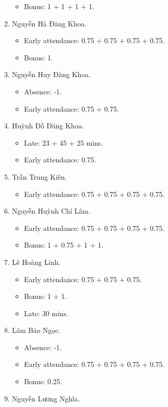 \documentclass{article}
\begin{document}
\begin{enumerate}
\begin{itemize}
		\item Bonus: 1 + 1 + 1 + 1.
	\end{itemize}
	\item {\sc Nguyễn Hà Đăng Khoa}.
	\begin{itemize}
		\item Early attendance: 0.75 + 0.75 + 0.75 + 0.75.
		\item Bonus: 1.
	\end{itemize}
	\item {\sc Nguyễn Huy Đăng Khoa.}
	\begin{itemize}
		\item Absence: -1.
		\item Early attendance: 0.75 + 0.75.
	\end{itemize}
	\item {\sc Huỳnh Đỗ Đăng Khoa.}
	\begin{itemize}
		\item Late: 23 + 45 + 25 mins.
		\item Early attendance: 0.75.
	\end{itemize}
	\item {\sc Trần Trung Kiên.}
	\begin{itemize}
		\item Early attendance: 0.75 + 0.75 + 0.75 + 0.75.
	\end{itemize}
	\item {\sc Nguyễn Huỳnh Chí Lâm.}
	\begin{itemize}
		\item Early attendance: 0.75 + 0.75 + 0.75 + 0.75.
		\item Bonus: 1 + 0.75 + 1 + 1.
	\end{itemize}
	\item {\sc Lê Hoàng Linh.}
	\begin{itemize}
		\item Early attendance: 0.75 + 0.75 + 0.75.
		\item Bonus: 1 + 1.
		\item Late: 30 mins.
	\end{itemize}
	\item {\sc Lâm Bảo Ngọc.}
	\begin{itemize}
		\item Absence: -1.
		\item Early attendance: 0.75 + 0.75 + 0.75 + 0.75.
		\item Bonus: 0.25.
	\end{itemize}
	\item {\sc Nguyễn Lương Nghĩa.}

\end{enumerate}
\end{document}
